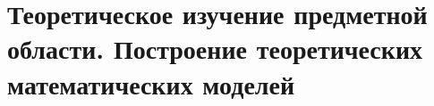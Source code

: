 \documentclass[../nirs.tex]{subfiles}
\begin{document}
\section{Теоретическое изучение предметной области. Построение теоретических
математических моделей}
	
\end{document}
